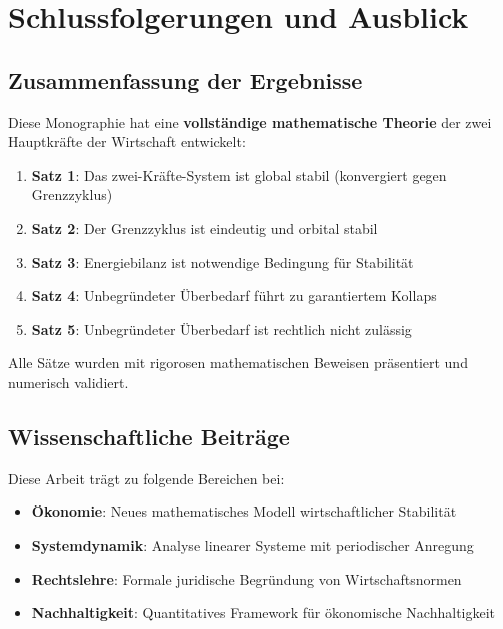 \documentclass[a4paper, 12pt, twoside, openright]{report}
\theoremstyle{definition}
\theoremstyle{definition}
\begin{document}
\section{Schlussfolgerungen und Ausblick}

\subsection{Zusammenfassung der Ergebnisse}

Diese Monographie hat eine \textbf{vollständige mathematische Theorie} der zwei Hauptkräfte der Wirtschaft entwickelt:

\begin{enumerate}
    \item \textbf{Satz 1}: Das zwei-Kräfte-System ist global stabil (konvergiert gegen Grenzzyklus)
    \item \textbf{Satz 2}: Der Grenzzyklus ist eindeutig und orbital stabil
    \item \textbf{Satz 3}: Energiebilanz ist notwendige Bedingung für Stabilität
    \item \textbf{Satz 4}: Unbegründeter Überbedarf führt zu garantiertem Kollaps
    \item \textbf{Satz 5}: Unbegründeter Überbedarf ist rechtlich nicht zulässig
\end{enumerate}

Alle Sätze wurden mit rigorosen mathematischen Beweisen präsentiert und numerisch validiert.

\subsection{Wissenschaftliche Beiträge}

Diese Arbeit trägt zu folgende Bereichen bei:

\begin{itemize}
    \item \textbf{Ökonomie}: Neues mathematisches Modell wirtschaftlicher Stabilität
    \item \textbf{Systemdynamik}: Analyse linearer Systeme mit periodischer Anregung
    \item \textbf{Rechtslehre}: Formale juridische Begründung von Wirtschaftsnormen
    \item \textbf{Nachhaltigkeit}: Quantitatives Framework für ökonomische Nachhaltigkeit
\end{itemize}
\end{document}
